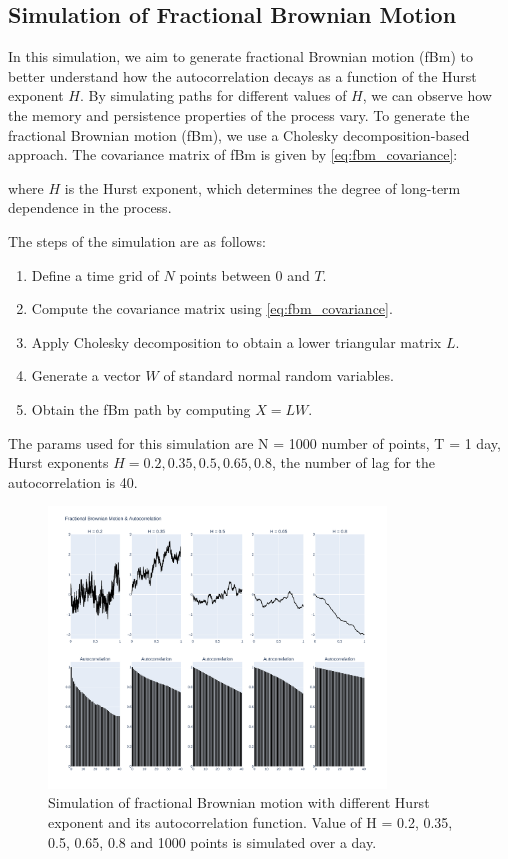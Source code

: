 \documentclass[11pt]{extarticle}
\begin{document}
\subsection{Simulation of Fractional Brownian Motion}

In this simulation, we aim to generate fractional Brownian motion (fBm) to better understand how the autocorrelation
decays as a function of the Hurst exponent \( H \). By simulating paths for different values of \( H \), we can observe
how the memory and persistence properties of the process vary.
To generate the fractional Brownian motion (fBm), we use a Cholesky decomposition-based approach. The covariance matrix of fBm is given by \eqref{eq:fbm_covariance}:

where \( H \) is the Hurst exponent, which determines the degree of long-term dependence in the process.

The steps of the simulation are as follows:
\begin{enumerate}
    \item Define a time grid of \( N \) points between \( 0 \) and \( T \).
    \item Compute the covariance matrix using \eqref{eq:fbm_covariance}.
    \item Apply Cholesky decomposition to obtain a lower triangular matrix \( L \).
    \item Generate a vector \( W \) of standard normal random variables.
    \item Obtain the fBm path by computing \( X = L W \).
\end{enumerate}

The params used for this simulation are N = 1000 number of points, T = 1 day, Hurst exponents \( H = 0.2, 0.35, 0.5, 0.65, 0.8 \), the number
of lag for the autocorrelation is 40.

\begin{figure}[!ht]
    \centering
    \includegraphics[width=0.8\textwidth]{img/fdm_autocorr}
    \caption{Simulation of fractional Brownian motion with different Hurst exponent and its autocorrelation function.
    Value of H = 0.2, 0.35, 0.5, 0.65, 0.8 and 1000 points is simulated over a day.}
    \label{fig:fbm_autocorr}
\end{figure}
\end{document}
